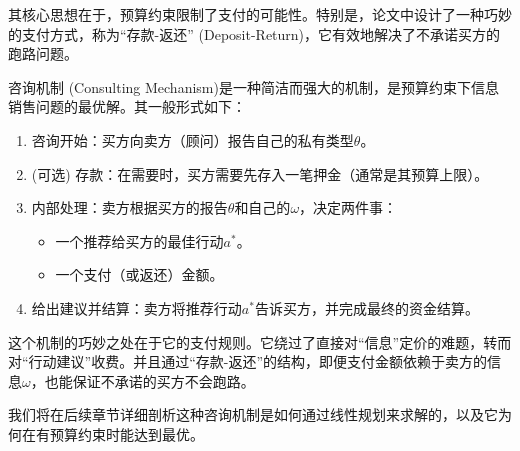 其核心思想在于，预算约束限制了支付的可能性。特别是，论文中设计了一种巧妙的支付方式，称为“存款-返还” (Deposit-Return)，它有效地解决了不承诺买方的跑路问题。

咨询机制 (Consulting Mechanism)是一种简洁而强大的机制，是预算约束下信息销售问题的最优解。其一般形式如下：
\begin{enumerate}
    \item 咨询开始：买方向卖方（顾问）报告自己的私有类型$\theta$。
    \item (可选) 存款：在需要时，买方需要先存入一笔押金（通常是其预算上限）。
    \item 内部处理：卖方根据买方的报告$\theta$和自己的$\omega$，决定两件事：
       \begin{itemize}
         \item 一个推荐给买方的最佳行动$a^\ast$。
         \item 一个支付（或返还）金额。
       \end{itemize}
    \item 给出建议并结算：卖方将推荐行动$a^\ast$告诉买方，并完成最终的资金结算。
\end{enumerate}

这个机制的巧妙之处在于它的支付规则。它绕过了直接对“信息”定价的难题，转而对“行动建议”收费。并且通过“存款-返还”的结构，即便支付金额依赖于卖方的信息$\omega$，也能保证不承诺的买方不会跑路。

我们将在后续章节详细剖析这种咨询机制是如何通过线性规划来求解的，以及它为何在有预算约束时能达到最优。